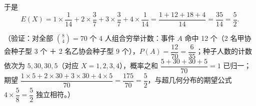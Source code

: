 \begin{answer}
于是
\nopagebreak[4]
\[
E(X)=1\times\dfrac{1}{14}+2\times\dfrac{3}{7}+3\times\dfrac{3}{7}+4\times\dfrac{1}{14}
=\dfrac{1+12+18+4}{14}=\dfrac{35}{14}=\dfrac{5}{2}.
\]

（验证：对全部 \(\binom{8}{4}=70\) 个 4 人组合穷举计数：事件 \(A\) 命中 12 个（2 名甲协会种子型 3 个 ＋ 2 名乙协会种子型 9 个），\(P(A)=\dfrac{12}{70}=\dfrac{6}{35}\)；种子人数的计数依次为 \(5,30,30,5\)（对应 \(X=1,2,3,4\)），概率之和 \(\dfrac{5+30+30+5}{70}=1\) 已归一；期望 \(\dfrac{1\times5+2\times30+3\times30+4\times5}{70}=\dfrac{175}{70}=\dfrac{5}{2}\)，与超几何分布的期望公式 \(4\times\dfrac{5}{8}=\dfrac{5}{2}\) 独立相符。）



\end{answer}
